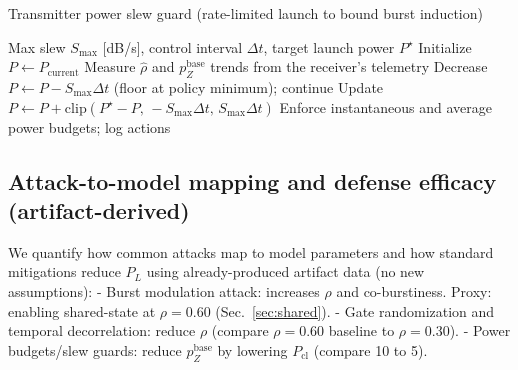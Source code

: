 \documentclass{article}
\begin{document}
\begin{algorithm}[ht]
\small
\caption{Transmitter power slew guard (rate-limited launch to bound burst induction)}\label{alg:slew}
\begin{algorithmic}[1]
\Require Max slew \(S_{\max}\) [dB/s], control interval \(\Delta t\), target launch power \(P^{\star}\)
\State Initialize \(P \gets P_{\mathrm{current}}\)
\Loop
  \State Measure \(\widehat{\rho}\) and \(p_Z^{\text{base}}\) trends from the receiver’s telemetry
   \State Decrease \(P \gets P - S_{\max}\Delta t\) (floor at policy minimum); continue \EndIf
  \State Update \(P \gets P + \mathrm{clip}(P^{\star}-P,\,-S_{\max}\Delta t,\,S_{\max}\Delta t)\)
  \State Enforce instantaneous and average power budgets; log actions
\EndLoop
\end{algorithmic}
\end{algorithm}

\subsection{Attack-to-model mapping and defense efficacy (artifact-derived)}
We quantify how common attacks map to model parameters and how standard mitigations reduce \(P_L\) using already-produced artifact data (no new assumptions):
- Burst modulation attack: increases \(\rho\) and co-burstiness. Proxy: enabling shared-state at \(\rho=0.60\) (Sec.~\ref{sec:shared}).
- Gate randomization and temporal decorrelation: reduce \(\rho\) (compare \(\rho=0.60\) baseline to \(\rho=0.30\)).
- Power budgets/slew guards: reduce \(p_Z^{\text{base}}\) by lowering \(P_{\mathrm{cl}}\) (compare \SI{10}{\dBm} to \SI{5}{\dBm}).
\end{document}
